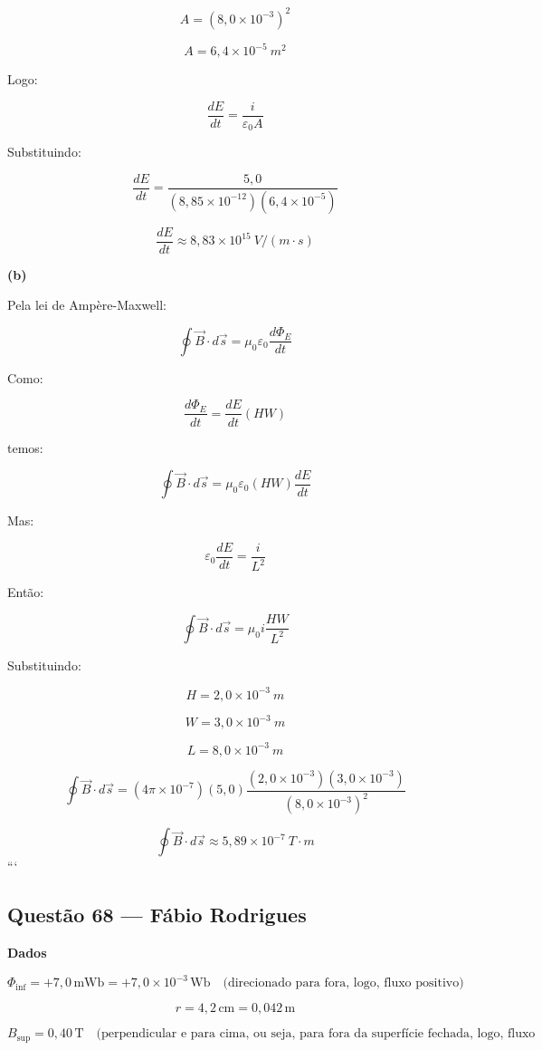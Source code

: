 \documentclass[12pt,a4paper]{article}
\begin{document}
\[
A=(8,0\times10^{-3})^2
\]

\[
A=6,4\times10^{-5}\ m^2
\]

Logo:

\[
\frac{dE}{dt}
=
\frac{i}{\varepsilon_0A}
\]

Substituindo:

\[
\frac{dE}{dt}
=
\frac{5,0}
{(8,85\times10^{-12})(6,4\times10^{-5})}
\]

\[
\frac{dE}{dt}
\approx8,83\times10^{15}\ V/(m\cdot s)
\]

\vspace{0.5cm}

\textbf{(b)}

Pela lei de Ampère-Maxwell:

\[
\oint \vec B\cdot d\vec s
=
\mu_0\varepsilon_0
\frac{d\Phi_E}{dt}
\]

Como:

\[
\frac{d\Phi_E}{dt}
=
\frac{dE}{dt}(HW)
\]

temos:

\[
\oint \vec B\cdot d\vec s
=
\mu_0\varepsilon_0
(HW)
\frac{dE}{dt}
\]

Mas:

\[
\varepsilon_0\frac{dE}{dt}
=
\frac{i}{L^2}
\]

Então:

\[
\oint \vec B\cdot d\vec s
=
\mu_0 i\frac{HW}{L^2}
\]

Substituindo:

\[
H=2,0\times10^{-3}\ m
\]

\[
W=3,0\times10^{-3}\ m
\]

\[
L=8,0\times10^{-3}\ m
\]

\[
\oint \vec B\cdot d\vec s
=
(4\pi\times10^{-7})(5,0)
\frac{(2,0\times10^{-3})(3,0\times10^{-3})}
{(8,0\times10^{-3})^2}
\]

\[
\oint \vec B\cdot d\vec s
\approx5,89\times10^{-7}\ T\cdot m
\]
```


\subsection{Questão 68 — Fábio Rodrigues}
\textbf{Dados}

\[
\Phi_{\text{inf}} = +7,0\,\text{mWb} = +7,0 \times 10^{-3}\,\text{Wb} \quad \text{(direcionado para fora, logo, fluxo positivo)}
\]

\[
r = 4,2\,\text{cm} = 0,042\,\text{m}
\]

\[
B_{\text{sup}} = 0,40\,\text{T} \quad \text{(perpendicular e para cima, ou seja, para fora da superfície fechada, logo, fluxo positivo)}
\]
\end{document}

